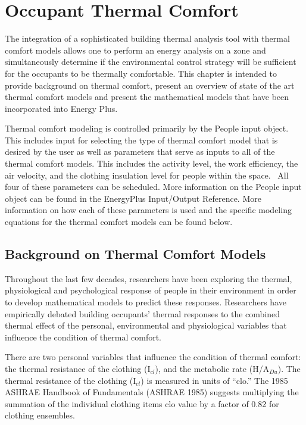 \section{Occupant Thermal Comfort }\label{occupant-thermal-comfort}

The integration of a sophisticated building thermal analysis tool with thermal comfort models allows one to perform an energy analysis on a zone and simultaneously determine if the environmental control strategy will be sufficient for the occupants to be thermally comfortable. This chapter is intended to provide background on thermal comfort, present an overview of state of the art thermal comfort models and present the mathematical models that have been incorporated into Energy Plus.

Thermal comfort modeling is controlled primarily by the People input object. This includes input for selecting the type of thermal comfort model that is desired by the user as well as parameters that serve as inputs to all of the thermal comfort models. This includes the activity level, the work efficiency, the air velocity, and the clothing insulation level for people within the space.~ All four of these parameters can be scheduled. More information on the People input object can be found in the EnergyPlus Input/Output Reference. More information on how each of these parameters is used and the specific modeling equations for the thermal comfort models can be found below.

\subsection{Background on Thermal Comfort Models}\label{background-on-thermal-comfort-models}

Throughout the last few decades, researchers have been exploring the thermal, physiological and psychological response of people in their environment in order to develop mathematical models to predict these responses. Researchers have empirically debated building occupants' thermal responses to the combined thermal effect of the personal, environmental and physiological variables that influence the condition of thermal comfort.

There are two personal variables that influence the condition of thermal comfort: the thermal resistance of the clothing (I\(_{cl}\)), and the metabolic rate (H/A\(_{Du}\)). The thermal resistance of the clothing (I\(_{cl}\)) is measured in units of ``clo.'' The 1985 ASHRAE Handbook of Fundamentals (ASHRAE 1985) suggests multiplying the summation of the individual clothing items clo value by a factor of 0.82 for clothing ensembles.

